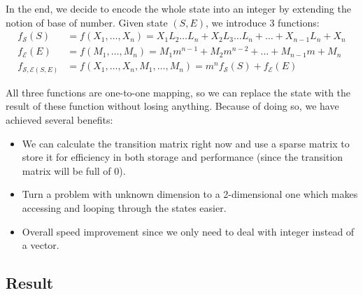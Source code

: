 \documentclass[
  a4paper, xcolor = usenames,dvipsnames]{article}
\providecommand{\tightlist}{%
  \setlength{\itemsep}{0pt}\setlength{\parskip}{0pt}}
\begin{document}
In the end, we decide to encode the whole state into an integer by extending the notion of base of number. Given state \((S, E)\), we introduce 3 functions:
\[
\begin{aligned}
f_{\mathcal{S}}(S) &= f(X_{1}, \dots, X_{n}) = X_{1} L_{2} \dots L_{n} + X_{2} L_{3} \dots L_{n} + \dots + X_{n - 1} L_{n} + X_{n} \\
f_{\mathcal{E}}(E) &= f(M_{1}, \dots, M_{n}) = M_{1} m^{n - 1} + M_{2} m^{n - 2} + \dots + M_{n - 1} m + M_{n} \\
f_{\mathcal{S, E}(S, E)} &= f(X_{1}, \dots, X_{n}, M_{1}, \dots, M_{n}) = m^{n} f_{\mathcal{S}}(S) + f_{\mathcal{E}}(E)
\end{aligned}
\]

All three functions are one-to-one mapping, so we can replace the state with the result of these function without losing anything. Because of doing so, we have achieved several benefits:

\begin{itemize}
\tightlist
\item
  We can calculate the transition matrix right now and use a sparse matrix to store it for efficiency in both storage and performance (since the transition matrix will be full of 0).
\item
  Turn a problem with unknown dimension to a 2-dimensional one which makes accessing and looping through the states easier.
\item
  Overall speed improvement since we only need to deal with integer instead of a vector.
\end{itemize}

\hypertarget{result}{%
\subsection{Result}\label{result}}

\newpage

\printbibliography
\end{document}
